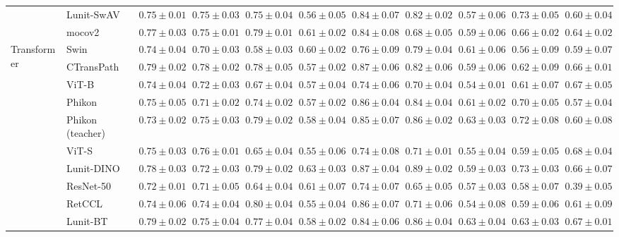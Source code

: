 \begin{tabular}{ll|cccc|c|cccc}
 & Lunit-SwAV & $0.75 \pm 0.01$ & $0.75 \pm 0.03$ & $0.75 \pm 0.04$ & $0.56 \pm 0.05$ & $0.84 \pm 0.07$ & $0.82 \pm 0.02$ & $0.57 \pm 0.06$ & $0.73 \pm 0.05$ & $0.60 \pm 0.04$ \\
 & mocov2 & $0.77 \pm 0.03$ & $0.75 \pm 0.01$ & $0.79 \pm 0.01$ & $0.61 \pm 0.02$ & $0.84 \pm 0.08$ & $0.68 \pm 0.05$ & $0.59 \pm 0.06$ & $0.66 \pm 0.02$ & $0.64 \pm 0.02$ \\
\cline{1-11}
\multirow[t]{12}{*}{Transformer} & Swin & $0.74 \pm 0.04$ & $0.70 \pm 0.03$ & $0.58 \pm 0.03$ & $0.60 \pm 0.02$ & $0.76 \pm 0.09$ & $0.79 \pm 0.04$ & $0.61 \pm 0.06$ & $0.56 \pm 0.09$ & $0.59 \pm 0.07$ \\
 & CTransPath & $\mathbf{0.79 \pm 0.02}$ & $\mathbf{0.78 \pm 0.02}$ & $0.78 \pm 0.05$ & $0.57 \pm 0.02$ & $0.87 \pm 0.06$ & $0.82 \pm 0.06$ & $0.59 \pm 0.06$ & $0.62 \pm 0.09$ & $0.66 \pm 0.01$ \\
 & ViT-B & $0.74 \pm 0.04$ & $0.72 \pm 0.03$ & $0.67 \pm 0.04$ & $0.57 \pm 0.04$ & $0.74 \pm 0.06$ & $0.70 \pm 0.04$ & $0.54 \pm 0.01$ & $0.61 \pm 0.07$ & $0.67 \pm 0.05$ \\
 & Phikon & $0.75 \pm 0.05$ & $0.71 \pm 0.02$ & $0.74 \pm 0.02$ & $0.57 \pm 0.02$ & $0.86 \pm 0.04$ & $0.84 \pm 0.04$ & $0.61 \pm 0.02$ & $0.70 \pm 0.05$ & $0.57 \pm 0.04$ \\
 & Phikon (teacher) & $0.73 \pm 0.02$ & $0.75 \pm 0.03$ & $0.79 \pm 0.02$ & $0.58 \pm 0.04$ & $0.85 \pm 0.07$ & $0.86 \pm 0.02$ & $0.63 \pm 0.03$ & $0.72 \pm 0.08$ & $0.60 \pm 0.08$ \\
 & ViT-S & $0.75 \pm 0.03$ & $0.76 \pm 0.01$ & $0.65 \pm 0.04$ & $0.55 \pm 0.06$ & $0.74 \pm 0.08$ & $0.71 \pm 0.01$ & $0.55 \pm 0.04$ & $0.59 \pm 0.05$ & $\mathbf{0.68 \pm 0.04}$ \\
 & Lunit-DINO & $0.78 \pm 0.03$ & $0.72 \pm 0.03$ & $0.79 \pm 0.02$ & $\mathbf{0.63 \pm 0.03}$ & $\mathbf{0.87 \pm 0.04}$ & $\mathbf{0.89 \pm 0.02}$ & $0.59 \pm 0.03$ & $\mathbf{0.73 \pm 0.03}$ & $0.66 \pm 0.07$ \\
 & ResNet-50 & $0.72 \pm 0.01$ & $0.71 \pm 0.05$ & $0.64 \pm 0.04$ & $0.61 \pm 0.07$ & $0.74 \pm 0.07$ & $0.65 \pm 0.05$ & $0.57 \pm 0.03$ & $0.58 \pm 0.07$ & $0.39 \pm 0.05$ \\
 & RetCCL & $0.74 \pm 0.06$ & $0.74 \pm 0.04$ & $\mathbf{0.80 \pm 0.04}$ & $0.55 \pm 0.04$ & $0.86 \pm 0.07$ & $0.71 \pm 0.06$ & $0.54 \pm 0.08$ & $0.59 \pm 0.06$ & $0.61 \pm 0.09$ \\
 & Lunit-BT & $0.79 \pm 0.02$ & $0.75 \pm 0.04$ & $0.77 \pm 0.04$ & $0.58 \pm 0.02$ & $0.84 \pm 0.06$ & $0.86 \pm 0.04$ & $\mathbf{0.63 \pm 0.04}$ & $0.63 \pm 0.03$ & $0.67 \pm 0.01$ \\

\end{tabular}
